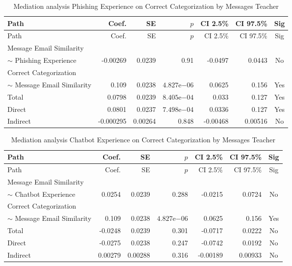 \begin{longtable}{lrrrrrc}
            \caption{Mediation analysis Phishing Experience on Correct Categorization by  Messages Teacher}\label{tab:mediation Phishing Experience on Correct Categorization by  Messages Teacher}\\
            \toprule
            Path & Coef. & SE & $p$ & CI 2.5\% & CI 97.5\% & Sig \\
            \midrule
            \endfirsthead
            \toprule
            Path & Coef. & SE & $p$ & CI 2.5\% & CI 97.5\% & Sig \\
            \midrule
            \endhead
            \bottomrule
            \endfoot
            Message Email Similarity\\ $\sim$ Phishing Experience & -0.00269 & 0.0239 & 0.91 & -0.0497 & 0.0443 & No \\
Correct Categorization\\ $\sim$ Message Email Similarity & 0.109 & 0.0238 & $4.827\mathrm{e}{-06}$ & 0.0625 & 0.156 & Yes \\
Total & 0.0798 & 0.0239 & $8.405\mathrm{e}{-04}$ & 0.033 & 0.127 & Yes \\
Direct & 0.0801 & 0.0237 & $7.498\mathrm{e}{-04}$ & 0.0336 & 0.127 & Yes \\
Indirect & -0.000295 & 0.00264 & 0.848 & -0.00468 & 0.00516 & No \\
\end{longtable}

\begin{longtable}{lrrrrrc}
            \caption{Mediation analysis Chatbot Experience on Correct Categorization by  Messages Teacher}\label{tab:mediation Chatbot Experience on Correct Categorization by  Messages Teacher}\\
            \toprule
            Path & Coef. & SE & $p$ & CI 2.5\% & CI 97.5\% & Sig \\
            \midrule
            \endfirsthead
            \toprule
            Path & Coef. & SE & $p$ & CI 2.5\% & CI 97.5\% & Sig \\
            \midrule
            \endhead
            \bottomrule
            \endfoot
            Message Email Similarity\\ $\sim$ Chatbot Experience & 0.0254 & 0.0239 & 0.288 & -0.0215 & 0.0724 & No \\
Correct Categorization\\ $\sim$ Message Email Similarity & 0.109 & 0.0238 & $4.827\mathrm{e}{-06}$ & 0.0625 & 0.156 & Yes \\
Total & -0.0248 & 0.0239 & 0.301 & -0.0717 & 0.0222 & No \\
Direct & -0.0275 & 0.0238 & 0.247 & -0.0742 & 0.0192 & No \\
Indirect & 0.00279 & 0.00288 & 0.316 & -0.00189 & 0.00933 & No \\
\end{longtable}

